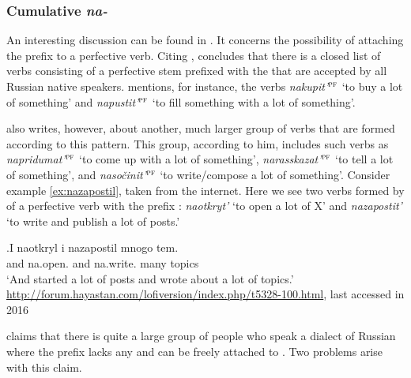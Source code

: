 \subsubsection{Cumulative \textit{na-}}
An interesting discussion can be found in \citet{Tatevosov:13a}. It concerns the possibility of attaching the  prefix  to a perfective verb. Citing \citet{Zaliznjak:03}, \citet{Tatevosov:13a} concludes that there is a closed list of verbs consisting of a perfective stem prefixed with the   that are accepted by all Russian native speakers. \citet{Tatevosov:13a} mentions, for instance, the verbs \textit{nakupit'}$^{\textsc{pf}}$ `to buy a lot of something' and \textit{napustit'}$^{\textsc{pf}}$ `to fill something with a lot of something'. 

\citeauthor{Tatevosov:13a} also writes, however, about another, much larger group of verbs that are formed according to this pattern. This group, according to him, includes such verbs as \textit{napridumat'}$^{\textsc{pf}}$ `to come up with a lot of something', \textit{narasskazat'}$^{\textsc{pf}}$ `to tell a lot of something', and \textit{naso\v{c}init'}$^{\textsc{pf}}$ `to write/compose a lot of something'. Consider example \ref{ex:nazapostil}, taken from the internet. Here we see two verbs formed by  of a perfective verb with the  prefix : \textit{naotkryt'} `to open a lot of X' and \textit{nazapostit'} `to write and publish a lot of posts.'
 
\exg.\label{ex:nazapostil}I naotkryl i nazapostil mnogo tem.\\
and na.open. and {na.write.} {many} {topics}\\
\trans `And started a lot of posts and wrote about a lot of topics.' \url{http://forum.hayastan.com/lofiversion/index.php/t5328-100.html}, last accessed in 2016

\citet{Tatevosov:13a} claims that there is quite a large group of people who speak a dialect of Russian where the  prefix  lacks any  and can be freely attached to . Two problems arise with this claim.

